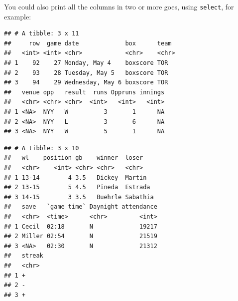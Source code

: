 \documentclass[]{tufte-book}
\newenvironment{Shaded}{}{}
\newcommand{\DataTypeTok}[1]{\textcolor[rgb]{0.56,0.13,0.00}{#1}}
\newcommand{\KeywordTok}[1]{\textcolor[rgb]{0.00,0.44,0.13}{\textbf{#1}}}
\newcommand{\NormalTok}[1]{#1}
\newcommand{\OperatorTok}[1]{\textcolor[rgb]{0.40,0.40,0.40}{#1}}
\newcommand{\OtherTok}[1]{\textcolor[rgb]{0.00,0.44,0.13}{#1}}
\newcommand{\StringTok}[1]{\textcolor[rgb]{0.25,0.44,0.63}{#1}}
\theoremstyle{definition}
\theoremstyle{definition}
\theoremstyle{definition}
\theoremstyle{remark}
\begin{document}
You could also print all the columns in two or more goes, using
\texttt{select}, for example:

\begin{Shaded}
\end{Shaded}

\begin{verbatim}
## # A tibble: 3 x 11
##     row  game date             box      team 
##   <int> <int> <chr>            <chr>    <chr>
## 1    92    27 Monday, May 4    boxscore TOR  
## 2    93    28 Tuesday, May 5   boxscore TOR  
## 3    94    29 Wednesday, May 6 boxscore TOR  
##   venue opp   result  runs Oppruns innings
##   <chr> <chr> <chr>  <int>   <int>   <int>
## 1 <NA>  NYY   W          3       1      NA
## 2 <NA>  NYY   L          3       6      NA
## 3 <NA>  NYY   W          5       1      NA
\end{verbatim}

\begin{Shaded}
\end{Shaded}

\begin{verbatim}
## # A tibble: 3 x 10
##   wl    position gb    winner  loser   
##   <chr>    <int> <chr> <chr>   <chr>   
## 1 13-14        4 3.5   Dickey  Martin  
## 2 13-15        5 4.5   Pineda  Estrada 
## 3 14-15        3 3.5   Buehrle Sabathia
##   save   `game time` Daynight attendance
##   <chr>  <time>      <chr>         <int>
## 1 Cecil  02:18       N             19217
## 2 Miller 02:54       N             21519
## 3 <NA>   02:30       N             21312
##   streak
##   <chr> 
## 1 +     
## 2 -     
## 3 +
\end{verbatim}
\end{document}
